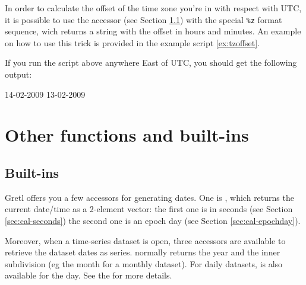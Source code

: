In order to calculate the offset of the time zone you're in with
respect with UTC, it is possible to use the  accessor (see
Section \ref{sec:cal-builtins}) with the special \texttt{\%z} format
sequence, wich returns a string with the offset in hours and
minutes. An example on how to use this trick is provided in the
example script \ref{ex:tzoffset}.

\begin{script}[htbp]
  \label{ex:tzoffset}
If you run the script above anywhere East of UTC, you should get the
following output:
\begin{outbit}
14-02-2009
13-02-2009
\end{outbit}
\end{script}

\section{Other functions and built-ins}
\label{sec:cal-otherfuncs}

\subsection{Built-ins}
\label{sec:cal-builtins}

Gretl offers you a few accessors for generating dates. One is
, which returns the current date/time as a 2-element
vector: the first one is in seconds (see Section
\ref{sec:cal-seconds}) the second one is an epoch day (see Section
\ref{sec:cal-epochday}).

Moreover, when a time-series dataset is open, three accessors are
available to retrieve the dataset dates as series. 
normally returns the year and  the inner subdivision
(eg the month for a monthly dataset). For daily datasets,
 is also available for the day. See the \GCR{} for
more details.

